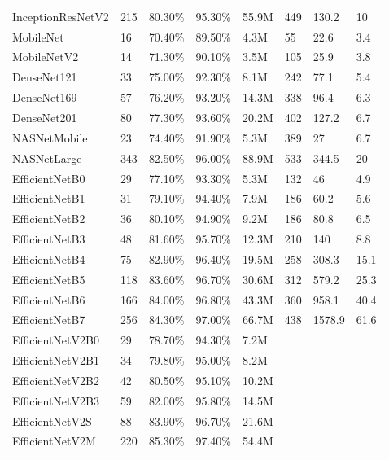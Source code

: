 \begin{appendices}
\begin{table}[ht]
{\begin{tabular}{llllllll}
            InceptionResNetV2 & 215 & 80.30\% & 95.30\% & 55.9M & 449 & 130.2 & 10 \\ 
            MobileNet & 16 & 70.40\% & 89.50\% & 4.3M & 55 & 22.6 & 3.4 \\ 
            MobileNetV2 & 14 & 71.30\% & 90.10\% & 3.5M & 105 & 25.9 & 3.8 \\ 
            DenseNet121 & 33 & 75.00\% & 92.30\% & 8.1M & 242 & 77.1 & 5.4 \\ 
            DenseNet169 & 57 & 76.20\% & 93.20\% & 14.3M & 338 & 96.4 & 6.3 \\ 
            DenseNet201 & 80 & 77.30\% & 93.60\% & 20.2M & 402 & 127.2 & 6.7 \\ 
            NASNetMobile & 23 & 74.40\% & 91.90\% & 5.3M & 389 & 27 & 6.7 \\ 
            NASNetLarge & 343 & 82.50\% & 96.00\% & 88.9M & 533 & 344.5 & 20 \\ 
            EfficientNetB0 & 29 & 77.10\% & 93.30\% & 5.3M & 132 & 46 & 4.9 \\ 
            EfficientNetB1 & 31 & 79.10\% & 94.40\% & 7.9M & 186 & 60.2 & 5.6 \\ 
            EfficientNetB2 & 36 & 80.10\% & 94.90\% & 9.2M & 186 & 80.8 & 6.5 \\ 
            EfficientNetB3 & 48 & 81.60\% & 95.70\% & 12.3M & 210 & 140 & 8.8 \\ 
            EfficientNetB4 & 75 & 82.90\% & 96.40\% & 19.5M & 258 & 308.3 & 15.1 \\ 
            EfficientNetB5 & 118 & 83.60\% & 96.70\% & 30.6M & 312 & 579.2 & 25.3 \\ 
            EfficientNetB6 & 166 & 84.00\% & 96.80\% & 43.3M & 360 & 958.1 & 40.4 \\ 
            EfficientNetB7 & 256 & 84.30\% & 97.00\% & 66.7M & 438 & 1578.9 & 61.6 \\ 
            EfficientNetV2B0 & 29 & 78.70\% & 94.30\% & 7.2M & ~ & ~ & ~ \\ 
            EfficientNetV2B1 & 34 & 79.80\% & 95.00\% & 8.2M & ~ & ~ & ~ \\ 
            EfficientNetV2B2 & 42 & 80.50\% & 95.10\% & 10.2M & ~ & ~ & ~ \\ 
            EfficientNetV2B3 & 59 & 82.00\% & 95.80\% & 14.5M & ~ & ~ & ~ \\ 
            EfficientNetV2S & 88 & 83.90\% & 96.70\% & 21.6M & ~ & ~ & ~ \\ 
            EfficientNetV2M & 220 & 85.30\% & 97.40\% & 54.4M & ~ & ~ & ~ \\ 

\end{tabular}}
\end{table}
\end{appendices}
